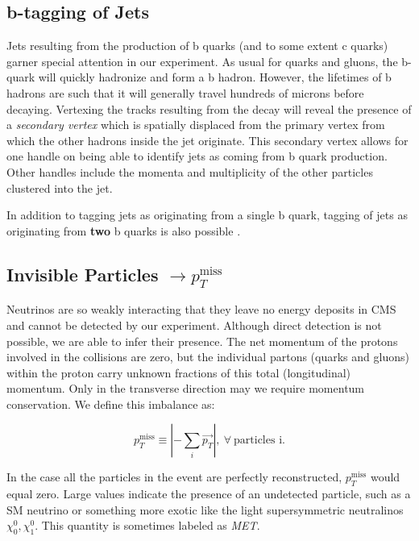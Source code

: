 \subsection{b-tagging of Jets}

Jets resulting from the production of b quarks (and to some extent c quarks) garner special attention in our experiment. As usual for quarks and gluons, the b-quark will quickly hadronize and form a b hadron. However, the lifetimes of b hadrons are such that it will generally travel hundreds of microns before decaying. Vertexing the tracks resulting from the decay will reveal the presence of a \textit{secondary vertex} which is spatially displaced from the primary vertex from which the other hadrons inside the jet originate. This secondary vertex allows for one handle on being able to identify jets as coming from b quark production. Other handles include the momenta and multiplicity of the other particles clustered into the jet.

In addition to tagging jets as originating from a single b quark, tagging of jets as originating from \textbf{two} b quarks is also possible \cite{bbtagger}.

\subsection{Invisible Particles $\rightarrow p_{T}^{\mathrm{miss}}$}

Neutrinos are so weakly interacting that they leave no energy deposits in CMS and cannot be detected by our experiment. Although direct detection is not possible, we are able to infer their presence. The net momentum of the protons involved in the collisions are zero, but the individual partons (quarks and gluons) within the proton carry unknown fractions of this total (longitudinal) momentum. Only in the transverse direction may we require momentum conservation. We define this imbalance as:

\begin{equation}
p_{T}^{\mathrm{miss}}  \equiv \left | - \sum_{i} \vec{p_{T}} \right |,~\forall~\textrm{particles~i}.
\end{equation}

In the case all the particles in the event are perfectly reconstructed, $p_{T}^{\mathrm{miss}}$ would equal zero. Large values indicate the presence of an undetected particle, such as a SM neutrino or something more exotic like the light supersymmetric neutralinos $\chi^{0}_{0}, \chi^{0}_{1}$. This quantity is sometimes labeled as \textit{MET}.

